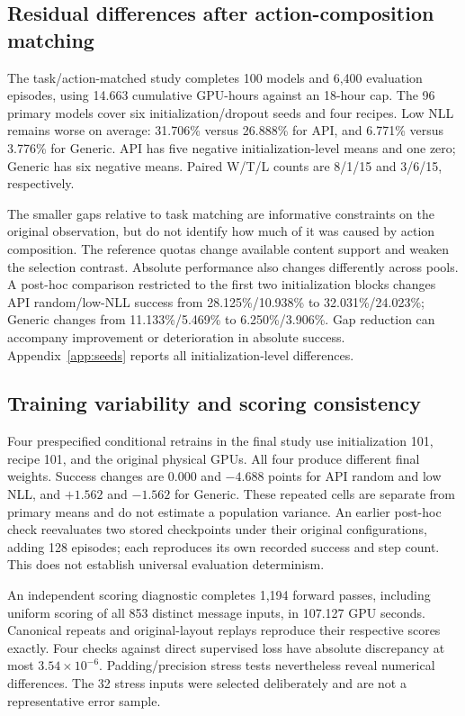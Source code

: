 \subsection{Residual differences after action-composition matching}
\label{sec:action}
The task/action-matched study completes 100 models and 6,400 evaluation episodes, using 14.663 cumulative GPU-hours against an 18-hour cap. The 96 primary models cover six initialization/dropout seeds and four recipes. Low NLL remains worse on average: 31.706\% versus 26.888\% for API, and 6.771\% versus 3.776\% for Generic. API has five negative initialization-level means and one zero; Generic has six negative means. Paired W/T/L counts are 8/1/15 and 3/6/15, respectively.

The smaller gaps relative to task matching are informative constraints on the original observation, but do not identify how much of it was caused by action composition. The reference quotas change available content support and weaken the selection contrast. Absolute performance also changes differently across pools. A post-hoc comparison restricted to the first two initialization blocks changes API random/low-NLL success from 28.125\%/10.938\% to 32.031\%/24.023\%; Generic changes from 11.133\%/5.469\% to 6.250\%/3.906\%. Gap reduction can accompany improvement or deterioration in absolute success. Appendix~\ref{app:seeds} reports all initialization-level differences.

\subsection{Training variability and scoring consistency}
\label{sec:scoring}
Four prespecified conditional retrains in the final study use initialization 101, recipe 101, and the original physical GPUs. All four produce different final weights. Success changes are 0.000 and $-4.688$ points for API random and low NLL, and $+1.562$ and $-1.562$ for Generic. These repeated cells are separate from primary means and do not estimate a population variance. An earlier post-hoc check reevaluates two stored checkpoints under their original configurations, adding 128 episodes; each reproduces its own recorded success and step count. This does not establish universal evaluation determinism.

An independent scoring diagnostic completes 1,194 forward passes, including uniform scoring of all 853 distinct message inputs, in 107.127 GPU seconds. Canonical repeats and original-layout replays reproduce their respective scores exactly. Four checks against direct supervised loss have absolute discrepancy at most $3.54\times10^{-6}$. Padding/precision stress tests nevertheless reveal numerical differences. The 32 stress inputs were selected deliberately and are not a representative error sample.

